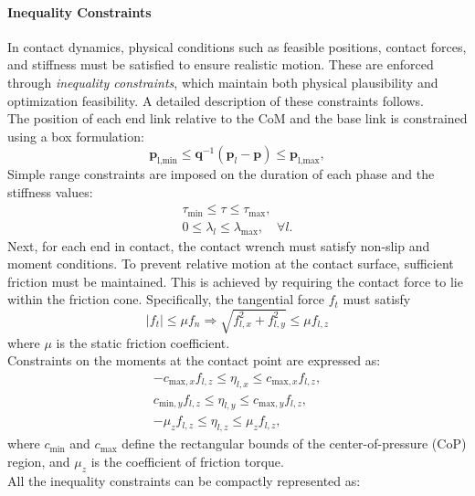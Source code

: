 \documentclass[main.tex]{subfiles}
\begin{document}
\begin{sloppypar}
\paragraph{Inequality Constraints}
In contact dynamics, physical conditions such as feasible positions, contact forces, and stiffness must be satisfied to ensure realistic motion. These are enforced through \textit{inequality constraints}, which maintain both physical plausibility and optimization feasibility. A detailed description of these constraints follows.\\
The position of each end link relative to the CoM and the base link is constrained using a box formulation:
\begin{equation}
\mathbf{p}_{\text{l,min}} \leq \mathbf{q}^{-1}(\mathbf{p}_l - \mathbf{p}) \leq \mathbf{p}_{\text{l,max}},
\end{equation}
Simple range constraints are imposed on the duration of each phase and the stiffness values:
\begin{align}
\tau_{\text{min}} \leq \tau \leq \tau_{\text{max}}, \\
0 \leq \lambda_l \leq \lambda_{\text{max}}, \quad \forall l.
\end{align}
Next, for each end in contact, the contact wrench must satisfy non-slip and moment conditions.  
To prevent relative motion at the contact surface, sufficient friction must be maintained. This is achieved by requiring the contact force to lie within the friction cone. Specifically, the tangential force $f_t$ must satisfy 
\begin{equation}
    \lvert f_t \rvert \leq \mu f_n  \Longrightarrow \sqrt{f_{l,x}^2 + f_{l,y}^2} \leq \mu f_{l,z}
\end{equation}
where $\mu$ is the static friction coefficient. \\
Constraints on the moments at the contact point are expressed as:
\begin{align}
-c_{\text{max},x} f_{l,z} \leq \eta_{l,x} \leq c_{\text{max},x} f_{l,z}, \\
c_{\text{min},y} f_{l,z} \leq \eta_{l,y} \leq c_{\text{max},y} f_{l,z}, \\
-\mu_z f_{l,z} \leq \eta_{l,z} \leq \mu_z f_{l,z},
\end{align}
where $c_{\text{min}}$ and $c_{\text{max}}$ define the rectangular bounds of the center-of-pressure (CoP) region, and $\mu_z$ is the coefficient of friction torque.\\
All the inequality constraints can be compactly represented as:
\begin{equation}

\end{equation}
\end{sloppypar}
\end{document}
